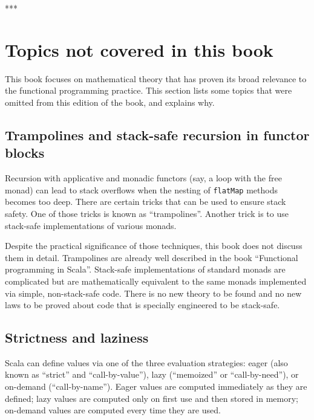 {*}{*}{*}

\setcounter{secnumdepth}{3}%
\begin{comment}
Restore the normal numbering of subsections and subsubsections
\end{comment}


\section{Topics not covered in this book}

This book focuses on mathematical theory that has proven its broad
relevance to the functional programming practice. This section lists
some topics that were omitted from this edition of the book, and explains
why.

\subsection{Trampolines and stack-safe recursion in functor blocks}

Recursion with applicative and monadic functors (say, a loop with
the free monad) can lead to stack overflows when the nesting of \lstinline!flatMap!
methods becomes too deep. There are certain tricks that can be used
to ensure stack safety. One of those tricks is known as \textsf{``}trampolines\textsf{''}.
Another trick is to use stack-safe implementations of various monads. 

Despite the practical significance of those techniques, this book
does not discuss them in detail. Trampolines are already well described
in the book \textsf{``}Functional programming in Scala\textsf{''}. Stack-safe implementations
of standard monads are complicated but are mathematically equivalent
to the same monads implemented via simple, non-stack-safe code. There
is no new theory to be found and no new laws to be proved about code
that is specially engineered to be stack-safe.

\subsection{Strictness and laziness}

Scala can define values via one of the three evaluation strategies:
eager (also known as \textsf{``}strict\textsf{''} and \textsf{``}call-by-value\textsf{''}), lazy (\textsf{``}memoized\textsf{''}
or \textsf{``}call-by-need\textsf{''}), or on-demand (\textsf{``}call-by-name\textsf{''}). Eager values
are computed immediately as they are defined; lazy values are computed
only on first use and then stored in memory; on-demand values are
computed every time they are used. 

